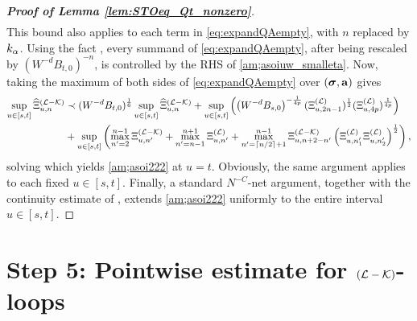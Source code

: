 \begin{proof}[\bf Proof of Lemma \ref{lem:STOeq_Qt_nonzero}]
\begin{align}
\end{align} 
This bound also applies to each term  in \eqref{eq:expandQAempty}, with $n$ replaced by $k_\alpha$. Using the fact , every summand of \eqref{eq:expandQAempty}, after being rescaled by
$(W^{-d}B_{t,0})^{-n}$, is controlled by the RHS of \eqref{am;asoiuw_smalleta}.
Now, taking the maximum of both sides of \eqref{eq:expandQAempty} over $({\boldsymbol{\sigma}},{\mathbf{a}})$ gives
\begin{align*}
\sup_{u\in[s,t]} \widehat\Xi^{({\mathcal L-\mathcal K})}_{u,n} &\prec (W^{-d}B_{t,0})^{\frac{1}{6}}\sup_{u\in [s,t]}
 \widehat\Xi^{(\mathcal L-\mathcal K)}_{u, n}  + \sup_{u\in[s,t]} \left(\left({W^{-d}B_{s,0}}\right)^{-\frac{1}{4p}}(\Xi^{(\mathcal L)}_{u, {2n-1}})^{\frac 1 2}(\Xi^{(\mathcal L)}_{u, 4p})^{\frac{1}{4p}}\right)\\
&+\sup_{u\in [s,t]}
  \left(\max_{n'=2}^{n-1} \Xi^{({\mathcal L-\mathcal K})}_{u,n'}+ \max_{n'=n-1}^{n+1} \Xi^{({\mathcal L})}_{u,n'} + \max_{n'=\lceil n/2\rceil + 1}^{n-1} \Xi^{({\mathcal L-\mathcal K})}_{u,n+2-n'} \left({\Xi^{({\mathcal L})}_{u,n_1'} \Xi^{({\mathcal L})}_{u,n_2'}}\right)^{\frac 12 } \right),\nonumber
\end{align*}
solving which yields \eqref{am;asoi222} at $u=t$. Obviously, the same argument applies to each fixed $u\in [s,t]$. Finally, a standard $N^{-C}$-net argument, together with the continuity estimate of , extends \eqref{am;asoi222} uniformly to the entire interval $u\in [s,t]$. 
\end{proof}

   
\section{Step 5: Pointwise estimate for \texorpdfstring{$(\mathcal L-\mathcal K)$-loops}{L-Kloop}}\label{Sec:Step5}

 

